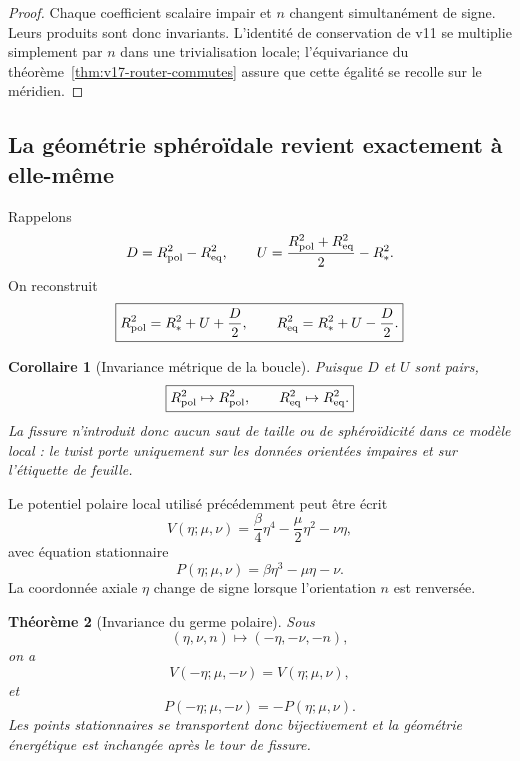 \documentclass[11pt,a4paper]{article}
\newtheorem{theorem}{Théorème}[section]
\newtheorem{corollary}[theorem]{Corollaire}
\begin{document}
\begin{proof}
Chaque coefficient scalaire impair et $n$ changent simultanément de signe. Leurs produits sont donc invariants. L'identité de conservation de v11 se multiplie simplement par $n$ dans une trivialisation locale; l'équivariance du théorème~\ref{thm:v17-router-commutes} assure que cette égalité se recolle sur le méridien.
\end{proof}

\subsection{La géométrie sphéroïdale revient exactement à elle-même}

Rappelons
\[
 D=R_{\rm pol}^2-R_{\rm eq}^2,
 \qquad
 U=\frac{R_{\rm pol}^2+R_{\rm eq}^2}{2}-R_*^2.
\]
On reconstruit
\begin{equation}\label{eq:v17-radii-reconstruct}
 \boxed{
 R_{\rm pol}^2
 =R_*^2+U+\frac D2,
 \qquad
 R_{\rm eq}^2
 =R_*^2+U-\frac D2.}
\end{equation}

\begin{corollary}[Invariance métrique de la boucle]\label{cor:v17-radii-invariant}
Puisque $D$ et $U$ sont pairs,
\begin{equation}\label{eq:v17-radii-invariant}
 \boxed{
 R_{\rm pol}^2\mapsto R_{\rm pol}^2,
 \qquad
 R_{\rm eq}^2\mapsto R_{\rm eq}^2.}
\end{equation}
La fissure n'introduit donc aucun saut de taille ou de sphéroïdicité dans ce modèle local : le twist porte uniquement sur les données orientées impaires et sur l'étiquette de feuille.
\end{corollary}

Le potentiel polaire local utilisé précédemment peut être écrit
\[
 V(\eta;\mu,\nu)
 =\frac{\beta}{4}\eta^4
 -\frac\mu2\eta^2
 -\nu\eta,
\]
avec équation stationnaire
\[
 P(\eta;\mu,\nu)
 =\beta\eta^3-\mu\eta-\nu.
\]
La coordonnée axiale $\eta$ change de signe lorsque l'orientation $n$ est renversée.

\begin{theorem}[Invariance du germe polaire]\label{thm:v17-polar-invariance}
Sous
\[
 (\eta,\nu,n)\longmapsto(-\eta,-\nu,-n),
\]
on a
\begin{equation}\label{eq:v17-potential-invariance}
 \boxed{
 V(-\eta;\mu,-\nu)=V(\eta;\mu,\nu),}
\end{equation}
et
\begin{equation}\label{eq:v17-cubic-equivariance}
 \boxed{
 P(-\eta;\mu,-\nu)
 =-P(\eta;\mu,\nu).}
\end{equation}
Les points stationnaires se transportent donc bijectivement et la géométrie énergétique est inchangée après le tour de fissure.
\end{theorem}
\end{document}
